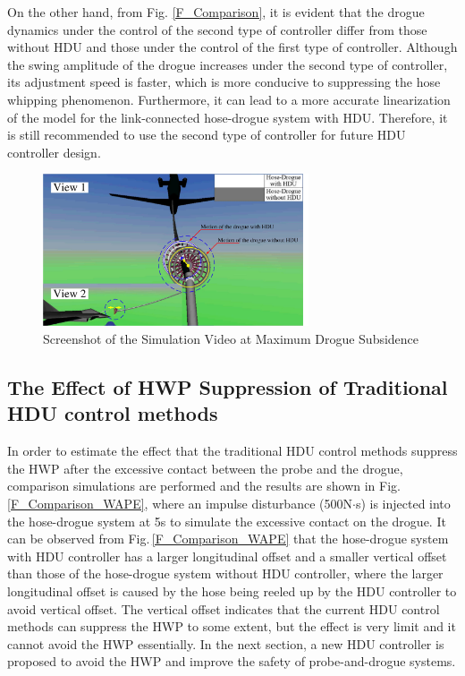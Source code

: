 On the other hand, from Fig. \ref{F_Comparison}, it is evident that the drogue dynamics under the control of the second type of controller differ from those without HDU and those under the control of the first type of controller. Although the swing amplitude of the drogue increases under the second type of controller, its adjustment speed is faster, which is more conducive to suppressing the hose whipping phenomenon. Furthermore, it can lead to a more accurate linearization of the model for the link-connected hose-drogue system with HDU. Therefore, it is still recommended to use the second type of controller for future HDU controller design.
\begin{figure}[th]
	\centering
	\includegraphics[width=0.7\textwidth]{Figures/Figs_Ch8/Fig13}
	\caption{Screenshot of the Simulation Video at Maximum Drogue Subsidence}\label{F_Sim_Subsidence}
\end{figure} 

\subsection{The Effect of HWP Suppression of Traditional HDU control methods}

In order to estimate the effect that the traditional HDU control methods
suppress the HWP after the excessive contact between the probe and
the drogue, comparison simulations are performed and the results are
shown in Fig.\,\ref{F_Comparison_WAPE}, where an impulse disturbance
(500N$\cdot$s) is injected into the hose-drogue system at 5s to simulate
the excessive contact on the drogue. It can be observed from Fig.\,\ref{F_Comparison_WAPE}
that the hose-drogue system with HDU controller has a larger longitudinal
offset and a smaller vertical offset than those of the hose-drogue
system without HDU controller, where the larger longitudinal offset
is caused by the hose being reeled up by the HDU controller to avoid
vertical offset. The vertical offset indicates that the current HDU
control methods can suppress the HWP to some extent, but the effect
is very limit and it cannot avoid the HWP essentially. In the next
section, a new HDU controller is proposed to avoid the HWP and improve
the safety of probe-and-drogue systems.


